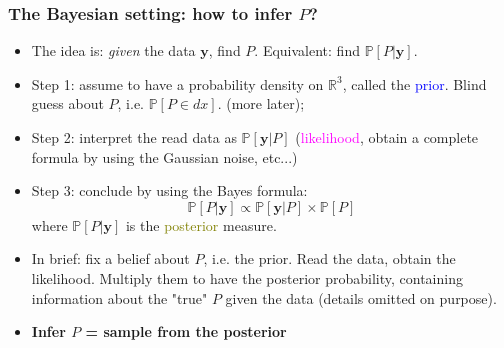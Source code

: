 \documentclass{beamer}
\begin{document}
\begin{frame}
	\frametitle{The Bayesian setting: how to infer $P$?}

	\begin{itemize}
		\item<1-> The idea is: \emph{given} the data $\textbf{y}$,
			find $P$. Equivalent: find
			$\mathbb{P}[P | \textbf{y}]$.
		\item<2-> Step 1: assume to have a probability
			density on $\mathbb{R}^3$, called the
			\textcolor{blue}{prior}. Blind guess about $P$,
			i.e. $\mathbb{P}[P \in dx]$.
			(more later);

		\item<3-> Step 2: interpret the read data as
			$\mathbb{P}[\textbf{y} | P]$
			(\textcolor{magenta}{likelihood}, 
			obtain a complete formula
			by using the Gaussian noise, etc...)

		\item<4-> Step 3: conclude by using the Bayes formula:
			\begin{equation}
				\mathbb{P}[P | \textbf{y}] \propto
				\mathbb{P}[\textbf{y} | P] 
				\times \mathbb{P}[P]
			\end{equation}
			where $\mathbb{P}[P | \textbf{y}]$ is the
			\textcolor{olive}{posterior} measure.

		\item<5-> In brief: fix a belief about $P$, i.e. the prior. 
			Read the data, obtain the likelihood.
			Multiply them to have the posterior
			probability, containing 
			information about the "true" $P$
			given the data (details omitted on purpose).
		\item<6-> \textbf{Infer $P$ = sample from the posterior}
	\end{itemize}
\end{frame}
\end{document}
